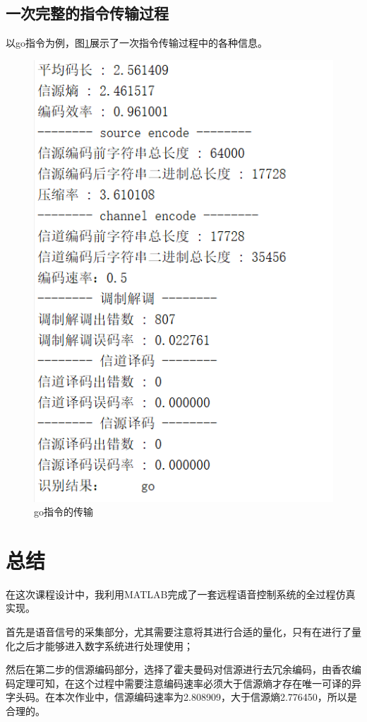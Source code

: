 \documentclass{../source/zju}
\begin{document}
    \subsection{一次完整的指令传输过程}
        以go指令为例，图\ref{例子}展示了一次指令传输过程中的各种信息。
        \begin{figure}[H]
            \centering
            \includegraphics[]{figure/例子.png}
            \caption{go指令的传输}
            \label{例子}
        \end{figure}

\section{总结}
    在这次课程设计中，我利用MATLAB完成了一套远程语音控制系统的全过程仿真实现。
    
    首先是语音信号的采集部分，尤其需要注意将其进行合适的量化，只有在进行了量化之后才能够进入数字系统进行处理使用；
    
    然后在第二步的信源编码部分，选择了霍夫曼码对信源进行去冗余编码，由香农编码定理可知，在这个过程中需要注意编码速率必须大于信源熵才存在唯一可译的异字头码。在本次作业中，信源编码速率为2.808909，大于信源熵2.776450，所以是合理的。
\end{document}
